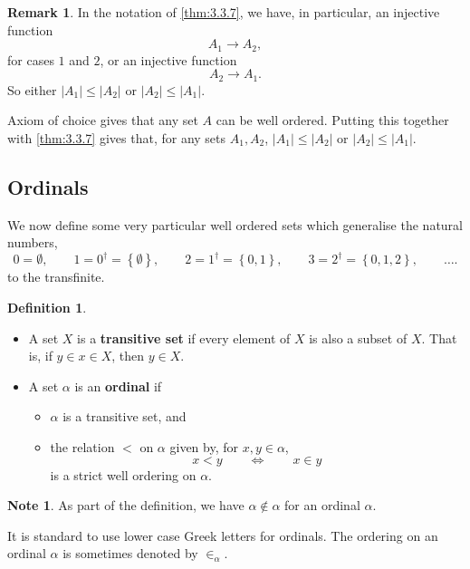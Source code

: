 \documentclass{article}
\newcommand{\cb}[1]{\left\{ #1 \right\}}
\newcommand{\abs}[1]{\left\lvert #1 \right\rvert}
\theoremstyle{definition}\newtheorem{definition}{Definition}[subsection]
\theoremstyle{definition}\newtheorem{remark1}[definition]{Remark}
\theoremstyle{definition}\newtheorem{example1}[definition]{Example}
\theoremstyle{definition}\newtheorem*{remark2}{Remark}
\theoremstyle{definition}\newtheorem*{example2}{Example}
\theoremstyle{definition}\newtheorem*{note}{Note}
\theoremstyle{definition}\newtheorem*{notation}{Notation}
\begin{document}

\begin{remark2}
In the notation of \ref{thm:3.3.7}, we have, in particular, an injective function
$$ A_1 \to A_2, $$
for cases $ 1 $ and $ 2 $, or an injective function
$$ A_2 \to A_1. $$
So either $ \abs{A_1} \le \abs{A_2} $ or $ \abs{A_2} \le \abs{A_1} $.
\end{remark2}

Axiom of choice gives that any set $ A $ can be well ordered. Putting this together with \ref{thm:3.3.7} gives that, for any sets $ A_1, A_2 $, $ \abs{A_1} \le \abs{A_2} $ or $ \abs{A_2} \le \abs{A_1} $.

\pagebreak

\subsection{Ordinals}

We now define some very particular well ordered sets which generalise the natural numbers,
$$ 0 = \emptyset, \qquad 1 = 0^\dagger = \cb{\emptyset}, \qquad 2 = 1^\dagger = \cb{0, 1}, \qquad 3 = 2^\dagger = \cb{0, 1, 2}, \qquad \dots. $$
to the transfinite.

\begin{definition}
\hfill
\begin{itemize}
\item A set $ X $ is a \textbf{transitive set} if every element of $ X $ is also a subset of $ X $. That is, if $ y \in x \in X $, then $ y \in X $.
\item A set $ \alpha $ is an \textbf{ordinal} if
\begin{itemize}
\item $ \alpha $ is a transitive set, and
\item the relation $ < $ on $ \alpha $ given by, for $ x, y \in \alpha $,
$$ x < y \qquad \iff \qquad x \in y $$
is a strict well ordering on $ \alpha $.
\end{itemize}
\end{itemize}
\end{definition}

\begin{note}
As part of the definition, we have $ \alpha \notin \alpha $ for an ordinal $ \alpha $.
\end{note}

It is standard to use lower case Greek letters for ordinals. The ordering on an ordinal $ \alpha $ is sometimes denoted by $ \in_\alpha $.
\end{document}
